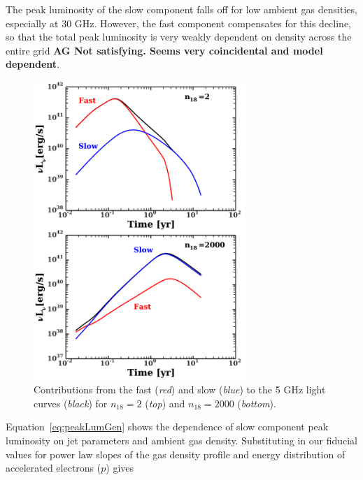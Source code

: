 \documentclass[usenatbib,fleqn]{mnras}
\begin{document}
The peak luminosity of the slow component falls off for low ambient
gas densities, especially at 30 GHz. However, the fast component
compensates for this decline, so that the total peak luminosity is
very weakly dependent on density across the entire grid {\bf AG Not
  satisfying. Seems very coincidental and model dependent}.

\begin{figure}
\includegraphics[width=8cm]{components.pdf}
\caption{\label{fig:components} Contributions from the fast
  (\textit{red}) and slow (\textit{blue}) to the 5 GHz light curves
  (\textit{black}) for $n_{18}=2$ (\textit{top}) and $n_{18}=2000$
  (\textit{bottom}).}
\end{figure}


Equation~\ref{eq:peakLumGen} shows the dependence of slow component
peak luminosity on jet parameters and ambient gas
density. Substituting in our fiducial values for power law slopes of
the gas density profile and energy distribution of accelerated
electrons ($p$) gives
\end{document}
